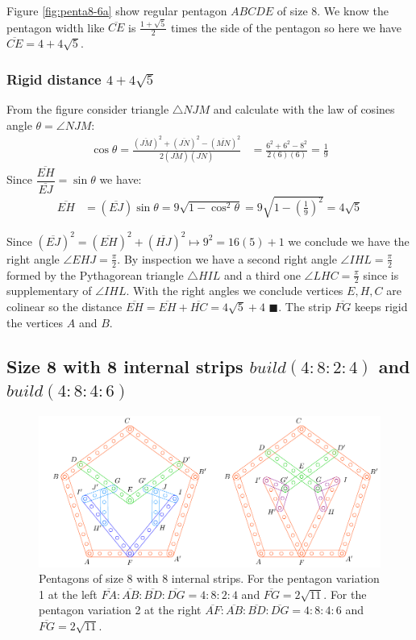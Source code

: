 \documentclass[11pt]{article}
\begin{document}
Figure \ref{fig:penta8-6a} show regular pentagon $ABCDE$ of size 8. We know the pentagon width like $\overline{CE}$ is $\frac{1+\sqrt5}2$ times the side of the pentagon so here we have $\overline{CE} = 4+4\sqrt5$.

\subsubsection{Rigid distance $4 + 4\sqrt5$}

From the figure consider triangle $\triangle{NJM}$ and calculate with the law of cosines angle $\theta = \angle{NJM}$:
\begin{align}
\cos\theta = \frac{(\overline{JM})^2 + (\overline{JN})^2 
 - (\overline{MN})^2}{2(\overline{JM})(\overline{JN})}
 &= \frac{6^2 + 6^2 - 8^2}{2(6)(6)} = \frac{1}9
\end{align}
Since $\dfrac{\overline{EH}}{\overline{EJ}} = \sin\theta$ we have:
\begin{align}
\overline{EH} &= (\overline{EJ})\sin\theta
 = 9\sqrt{1-\cos^2\theta} 
 = 9\sqrt{1-\left(\frac{1}9\right)^2} = 4\sqrt5
\end{align}

Since $(\overline{EJ})^2 = (\overline{EH})^2 + (\overline{HJ})^2 \mapsto 9^2 = 16(5) + 1$ we conclude we have the right angle $\angle{EHJ} = \frac{\pi}2$. By inspection we have a second right angle $\angle{IHL} = \frac{\pi}2$ formed by the Pythagorean triangle $\triangle{HIL}$ and a third one $\angle{LHC} = \frac{\pi}2$ since is supplementary of $\angle{IHL}$. With the right angles we conclude vertices $E,H,C$ are colinear so the distance $\overline{EH} = \overline{EH} + \overline{HC} = 4\sqrt{5} + 4$ $\blacksquare$.
The strip $\overline{FG}$ keeps rigid the vertices $A$ and $B$.

\subsection{Size 8 with 8 internal strips $build(4:8:2:4)$ and $build(4:8:4:6)$}

\begin{figure}[H]
\centering
\includegraphics[scale=1]{8/penta8-8a}
\caption{Pentagons of size 8 with 8 internal strips. For the pentagon variation 1 at the left $\overline{FA}:\overline{AB}:\overline{BD}:\overline{DG} = 4:8:2:4$ and $\overline{FG}=2\sqrt{11}$. For the pentagon variation 2 at the right $\overline{AF}:\overline{AB}:\overline{BD}:\overline{DG} = 4:8:4:6$ and $\overline{FG}=2\sqrt{11}$.}
\label{fig:penta8-8a}
\end{figure}
\end{document}
